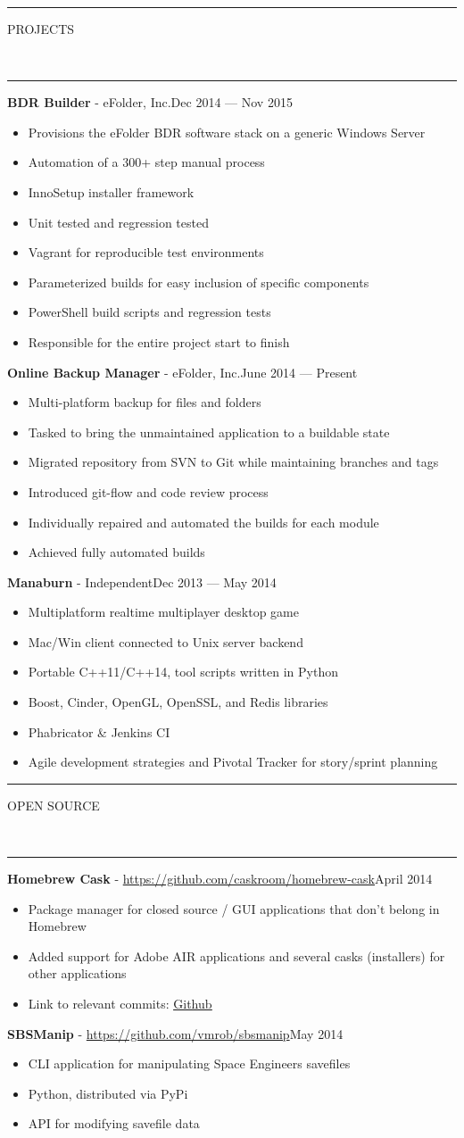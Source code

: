 \documentclass[10pt, letterpaper, oneside]{article}
\newcommand{\HRule}[2]{\textcolor{#1}{\rule{\linewidth}{#2}}}
\newcommand{\sectiontitle}[1]{\begin{minipage}{\textwidth}\HRule{black}{0.25mm}\vspace{-10pt}\begin{center}\Large\MakeUppercase{#1}\end{center}\end{minipage}\\\HRule{light-grey}{0.15mm}\vspace{\baselineskip}}
\newenvironment{ressection}[1]{
  \sectiontitle{#1}}
  {\vspace{0.5\baselineskip}}
\newenvironment{tightressection}[1]{
  \begin{minipage}{\textwidth}
  \sectiontitle{#1}}
  {\vspace{2\baselineskip}\end{minipage}}
\newcommand{\resitem}[1]{
    \vspace{2pt}
    \item \begin{flushleft} #1 \end{flushleft}
}
\newcommand{\resentryheader}[3]{
    \vspace{-5pt}
    \textbf{#1} - #2\hspace{\stretch{1}}\textcolor{light-grey}{#3}\\
}
\newenvironment{resentry}[3]{
  \begin{minipage}{\textwidth}
    \resentryheader{#1}{#2}{#3}
        \vspace{-\baselineskip}
    \begin{itemize}[noitemsep,nolistsep]
}{
    \end{itemize}
        \vspace{\baselineskip}
        \end{minipage}
}
\begin{document}
\begin{ressection}{Projects}
  \begin{resentry}{BDR Builder}{eFolder, Inc.}{Dec 2014 --- Nov 2015}
    \resitem{Provisions the eFolder BDR software stack on a generic Windows Server}
    \resitem{Automation of a 300+ step manual process}
    \resitem{InnoSetup installer framework}
    \resitem{Unit tested and regression tested}
    \resitem{Vagrant for reproducible test environments}
    \resitem{Parameterized builds for easy inclusion of specific components}
    \resitem{PowerShell build scripts and regression tests}
    \resitem{Responsible for the entire project start to finish}
  \end{resentry}
  \begin{resentry}{Online Backup Manager}{eFolder, Inc.}{June 2014 --- Present}
    \resitem{Multi-platform backup for files and folders}
    \resitem{Tasked to bring the unmaintained application to a buildable state}
    \resitem{Migrated repository from SVN to Git while maintaining branches and tags}
    \resitem{Introduced git-flow and code review process}
    \resitem{Individually repaired and automated the builds for each module}
    \resitem{Achieved fully automated builds}
  \end{resentry}
  \begin{resentry}{Manaburn}{Independent}{Dec 2013 --- May 2014}
    \resitem{Multiplatform realtime multiplayer desktop game}
    \resitem{Mac/Win client connected to Unix server backend}
    \resitem{Portable C++11/C++14, tool scripts written in Python}
    \resitem{Boost, Cinder, OpenGL, OpenSSL, and Redis libraries}
    \resitem{Phabricator \& Jenkins CI}
    \resitem{Agile development strategies and Pivotal Tracker for story/sprint planning}
  \end{resentry}
\end{ressection}

\begin{tightressection}{Open Source}
  \begin{resentry}{Homebrew Cask}{\href{https://github.com/caskroom/homebrew-cask}{https://github.com/caskroom/homebrew-cask}}{April 2014}
    \resitem{Package manager for closed source / GUI applications that don't belong in Homebrew}
    \resitem{Added support for Adobe AIR applications and several casks (installers) for other applications}
    \resitem{Link to relevant commits: \href{https://github.com/caskroom/homebrew-cask/commits?author=vmrob}{\ul{Github}}}
  \end{resentry}

  \begin{resentry}{SBSManip}{\href{https://github.com/vmrob/sbsmanip}{https://github.com/vmrob/sbsmanip}}{May 2014}
    \resitem{CLI application for manipulating Space Engineers savefiles}
    \resitem{Python, distributed via PyPi}
    \resitem{API for modifying savefile data}
  \end{resentry}
\end{tightressection}
\end{document}

